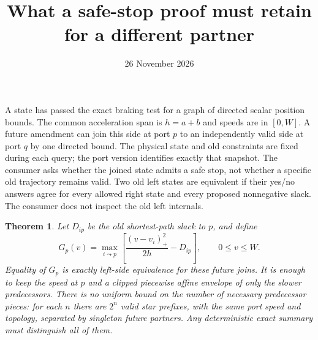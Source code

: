 \documentclass[11pt]{article}
\title{What a safe-stop proof must retain for a different partner}
\author{}
\date{26 November 2026}
\newtheorem{theorem}{Theorem}
\begin{document}
\maketitle

A state has passed the exact braking test for a graph of directed scalar position bounds. The common acceleration span is $h=a+b$ and speeds are in $[0,W]$. A future amendment can join this side at port $p$ to an independently valid side at port $q$ by one directed bound. The physical state and old constraints are fixed during each query; the port version identifies exactly that snapshot. The consumer asks whether the joined state admits a safe stop, not whether a specific old trajectory remains valid. Two old left states are equivalent if their yes/no answers agree for every allowed right state and every proposed nonnegative slack. The consumer does not inspect the old left internals.

\begin{theorem}
Let $D_{ip}$ be the old shortest-path slack to $p$, and define
\[
  G_p(v)=\max_{i\leadsto p}
  \left[\frac{(v-v_i)_+^2}{2h}-D_{ip}\right],
  \qquad 0\le v\le W .
\]
Equality of $G_p$ is exactly left-side equivalence for these future joins. It is enough to keep the speed at $p$ and a clipped piecewise affine envelope of only the slower predecessors. There is no uniform bound on the number of necessary predecessor pieces: for each $n$ there are $2^n$ valid star prefixes, with the same port speed and topology, separated by singleton future partners. Any deterministic exact summary must distinguish all of them.
\end{theorem}
\end{document}
